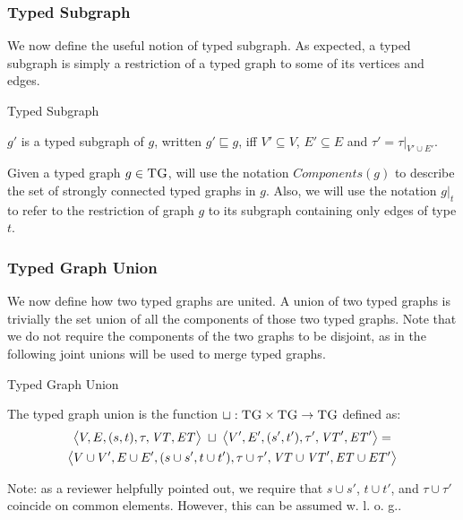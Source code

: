 \subsubsection*{Typed Subgraph}
We now define the useful notion of typed subgraph. As expected, a typed subgraph is simply a restriction of a typed graph to some of its vertices and edges. 

\begin{definition}{Typed Subgraph\\}
\label{def:typedsubgraph}

$g'$ is a typed subgraph of $g$, written $g'\sqsubseteq g$, iff $V'\subseteq V$, $E'\subseteq E$ and $\tau'=\tau |_{V'\cup E'}$.

\end{definition}

Given a typed graph $g\in \textsc{TG}$, will use the notation $Components(g)$ to describe the set of strongly connected typed graphs in $g$. Also, we will use the notation $g|_{t}$ to refer to the restriction of graph $g$ to its subgraph containing only edges of type $t$.


\subsubsection*{Typed Graph Union}
We now define how two typed graphs are united. A union of two typed graphs is trivially the set union of all the components of those two typed graphs. Note that we do not require the components of the two graphs to be disjoint, as in the following joint unions will be used to merge typed graphs.

\begin{definition}{Typed Graph Union\\}
\label{def:typed_graph_union}

The typed graph union is the function $\sqcup :\textsc{TG}\times \textsc{TG}\rightarrow \textsc{TG}$ defined as:
\begin{multline*}
\big\langle V,E,(s,t),\tau,\mathit{VT},\mathit{ET}\big\rangle\;\sqcup\;\big\langle V',E',(s',t'),\tau',\mathit{VT}',\mathit{ET}'\big\rangle=\\
\big\langle V\cup V', E\cup E',(s\cup s', t\cup t'), \tau\cup \tau', \mathit{VT}\cup \mathit{VT}', \mathit{ET}\cup ET'\big\rangle
\end{multline*}
\end{definition}

Note: as a reviewer helpfully pointed out, we require that $s \cup s'$, $t \cup t'$, and $\tau \cup \tau'$ coincide on common elements. However, this can be assumed w. l. o. g..


